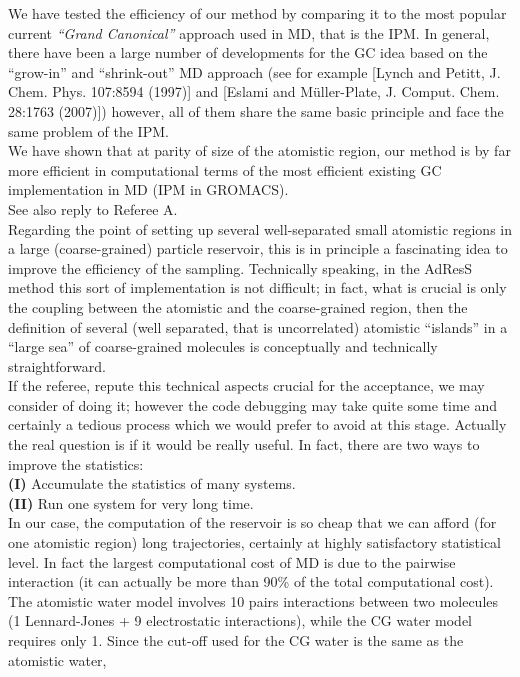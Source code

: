 \documentclass[12pt,a4paper]{article}
\begin{document}
We have tested the efficiency of our method by comparing it to the most popular current {\it ``Grand Canonical''} approach used in MD, that is the {IPM}.
In general, there have been a large number of developments for the GC idea based on the ``grow-in'' and ``shrink-out'' MD approach (see for example [Lynch and Petitt, J. Chem. Phys. 107:8594 (1997)] and [Eslami and M\"uller-Plate,
  J. Comput. Chem. 28:1763 (2007)]) however, all of them  share the same basic principle and face the same problem
  of the IPM.
\\
We have shown that at parity of size of the atomistic region, our method is by far more efficient in computational terms of the most efficient existing GC implementation in MD (IPM in GROMACS).\\
See also reply to Referee A.\\
Regarding the point of setting up several  well-separated small atomistic regions in a large (coarse-grained) particle reservoir, this is in principle
  a fascinating idea to improve the efficiency of the sampling. Technically speaking, in the AdResS method this sort of implementation is not difficult;
in fact, what is crucial is only the coupling between the atomistic and the coarse-grained region, then the definition of several (well separated, that is uncorrelated)
atomistic ``islands'' in a ``large sea'' of coarse-grained molecules is conceptually and technically straightforward.\\
If the referee, repute this technical aspects crucial for the acceptance, we may consider of doing it; however the code debugging may take quite some time and certainly a tedious process which we would prefer to avoid at this stage.
Actually the real question is if it would be really useful.
In fact, there are two ways to improve the statistics:\\
{\bf (I)} Accumulate the statistics of many systems.\\
{\bf (II)} Run one system for very long time.\\
In our case, the computation of the reservoir is so cheap that we can afford (for one atomistic region) long trajectories, certainly at highly satisfactory statistical level. In fact {the
  largest computational cost of MD} is due to the pairwise interaction (it can actually be more than 90\% of the total computational cost).
  The atomistic water model involves 10 pairs interactions between two molecules (1 Lennard-Jones + 9 electrostatic interactions),
  while the CG water model requires only 1. Since the cut-off used for the CG water is the same as the atomistic water,
\end{document}
